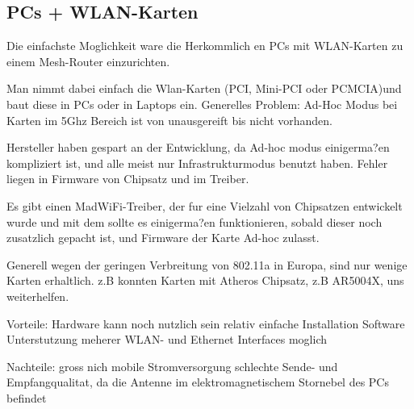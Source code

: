 \subsection{PCs + WLAN-Karten}

Die einfachste Moglichkeit ware die Herkommlich en PCs mit WLAN-Karten zu einem Mesh-Router einzurichten. 

Man nimmt dabei einfach die Wlan-Karten (PCI, Mini-PCI oder PCMCIA)und baut diese in PCs oder in Laptops ein. 
Generelles Problem: 
 Ad-Hoc Modus bei Karten im 5Ghz Bereich ist von unausgereift bis nicht vorhanden. 

Hersteller haben gespart an der Entwicklung, da Ad-hoc modus einigerma?en kompliziert ist, und alle meist nur Infrastrukturmodus benutzt haben. Fehler liegen in Firmware von Chipsatz und im Treiber. 

Es gibt einen MadWiFi-Treiber, der fur eine Vielzahl von Chipsatzen entwickelt wurde und mit dem sollte es einigerma?en funktionieren, sobald dieser noch zusatzlich gepacht ist, und Firmware der Karte Ad-hoc zulasst. 

Generell wegen der geringen Verbreitung von 802.11a in Europa, sind nur wenige Karten erhaltlich. z.B konnten Karten mit Atheros Chipsatz, z.B AR5004X, uns weiterhelfen. 

Vorteile: 
Hardware kann noch nutzlich sein 
relativ einfache Installation 
Software Unterstutzung 
meherer WLAN- und Ethernet Interfaces moglich 

Nachteile: 
gross 
nich mobile 
Stromversorgung 
schlechte Sende- und Empfangqualitat, da die Antenne im elektromagnetischem Stornebel des PCs befindet 


